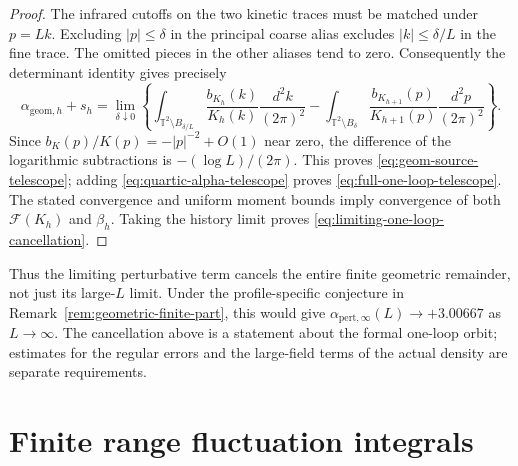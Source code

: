 \documentclass[11pt]{article}
\numberwithin{equation}{section}
\theoremstyle{definition}
\theoremstyle{plain}
\begin{document}
\begin{proof}
The infrared cutoffs on the two kinetic traces must be matched
under $p=Lk$.  Excluding $|p|\le\delta$ in the principal coarse
alias excludes $|k|\le\delta/L$ in the fine trace.  The omitted
pieces in the other aliases tend to zero.  Consequently the
determinant identity gives precisely
\begin{equation}
 \alpha_{\mathrm{geom},h}+s_h
 =\lim_{\delta\downarrow0}\left\{
   \int_{\mathbb T^2\setminus B_{\delta/L}}
        \frac{b_{K_h}(k)}{K_h(k)}\frac{d^2k}{(2\pi)^2}
   -\int_{\mathbb T^2\setminus B_\delta}
        \frac{b_{K_{h+1}}(p)}{K_{h+1}(p)}
                                      \frac{d^2p}{(2\pi)^2}
                              \right\}.
 \label{eq:matched-infrared-finite-parts}
\end{equation}
Since $b_K(p)/K(p)=-|p|^{-2}+O(1)$ near zero, the difference
of the logarithmic subtractions is $-(\log L)/(2\pi)$.
This proves \eqref{eq:geom-source-telescope}; adding
\eqref{eq:quartic-alpha-telescope} proves
\eqref{eq:full-one-loop-telescope}.
The stated convergence and uniform moment bounds imply
convergence of both $\mathcal F(K_h)$ and $\beta_h$.
Taking the history limit proves
\eqref{eq:limiting-one-loop-cancellation}.
\end{proof}

Thus the limiting perturbative term cancels the entire finite
geometric remainder, not just its large-$L$ limit.  Under the
profile-specific conjecture in
Remark~\ref{rem:geometric-finite-part}, this would give
$\alpha_{\mathrm{pert},\infty}(L)\to+3.00667$ as $L\to\infty$.
The cancellation above is a statement about the formal one-loop
orbit; estimates for the regular errors and the large-field
terms of the actual density are separate requirements.

\newpage
\section{Finite range fluctuation integrals}
\end{document}
